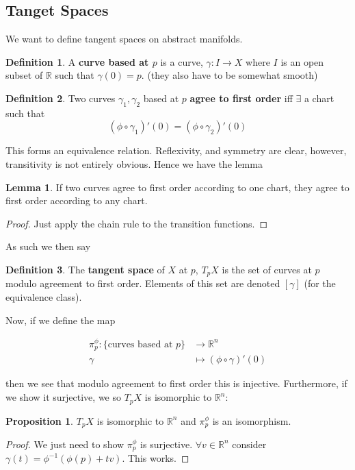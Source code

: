 \documentclass{article}
\theoremstyle{definition}
\newtheorem{definition}{Definition}
\newtheorem{proposition}{Proposition}
\newtheorem{lemma}{Lemma}
\begin{document}
\subsection{Tanget Spaces}

We want to define tangent spaces on abstract manifolds.

\begin{definition}
  A \textbf{curve based at $p$} is a curve, $\gamma : I \to X$ where $I$ is an
  open subset of $\mathbb{R}$ such that $\gamma(0) = p$. (they also have to be
  somewhat smooth)
\end{definition}

\begin{definition}
  Two curves $\gamma_1, \gamma_2$ based at $p$ \textbf{agree to first order} iff
  $\exists$ a chart such that
  $$ (\phi \circ \gamma_1)'(0) = (\phi \circ \gamma_2)'(0) $$
\end{definition}

This forms an equivalence relation. Reflexivity, and symmetry are clear,
however, transitivity is not entirely obvious. Hence we have the lemma

\begin{lemma}
  If two curves agree to first order according to one chart, they agree to first
  order according to any chart.
\end{lemma}
\begin{proof}
  Just apply the chain rule to the transition functions.
\end{proof}

As such we then say

\begin{definition}
  The \textbf{tangent space} of $X$ at $p$, $T_pX$ is the set of curves at $p$
  modulo agreement to first order. Elements of this set are denoted $[\gamma]$
  (for the equivalence class).
\end{definition}

Now, if we define the map

\begin{align*}
  \pi^\phi_p : \{ \text{curves based at } p\} &\to \mathbb{R}^n \\
  \gamma &\mapsto (\phi \circ \gamma)'(0)
\end{align*}

then we see that modulo agreement to first order this is injective. Furthermore,
if we show it surjective, we so $T_pX$ is isomorphic to $\mathbb{R}^n$:

\begin{proposition}
  $T_pX$ is isomorphic to $\mathbb{R}^n$ and $\pi^\phi_p$ is an isomorphism.
\end{proposition}
\begin{proof}
  We just need to show $\pi_p^\phi$ is surjective. $\forall v \in \mathbb{R}^n$
  consider $\gamma(t) = \phi^{-1} (\phi(p) + tv)$. This works.
\end{proof}
\end{document}
